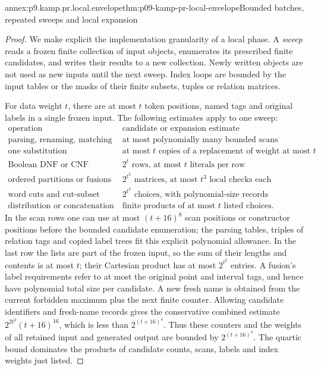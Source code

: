 \begin{annexitem}{annex:p9.kamp.pr.local.envelope}{thm:p09-kamp-pr-local-envelope}{Bounded batches, repeated sweeps and local expansion}
\begin{proof}
We make explicit the implementation granularity of a local phase.
A \emph{sweep} reads a frozen finite collection of input objects,
enumerates its prescribed finite candidates, and writes their results
to a new collection. Newly written objects are not used as new inputs
until the next sweep. Index loops are bounded by the input tables or
the masks of their finite subsets, tuples or relation matrices.

For data weight \(t\), there are at most \(t\) token
positions, named tags and original labels in a single frozen input.
The following estimates apply to one sweep:
\[
\begin{array}{l|l}
 \text{operation}&\text{candidate or expansion estimate}\\ \hline
 \text{parsing, renaming, matching}&\text{at most polynomially many bounded scans}\\
 \text{one substitution}&\text{at most }t\text{ copies of a replacement of weight at most }t\\
 \text{Boolean DNF or CNF}&2^t\text{ rows, at most }t\text{ literals per row}\\
 \text{ordered partitions or fusions}&2^{t^2}\text{ matrices, at most }t^3\text{ local checks each}\\
 \text{word cuts and cut-subset tuples}&2^{t^2}\text{ choices, with polynomial-size records}\\
 \text{distribution or concatenation}&\text{finite products of at most }t\text{ listed choices}.
\end{array}
\]
In the scan rows one can use at most \((t+16)^8\) scan positions
or constructor positions before the bounded candidate enumeration;
the parsing tables, triples of relation tags and copied label trees
fit this explicit polynomial allowance. In the last row the lists are part of the frozen input, so the
sum of their lengths and contents is at most \(t\); their
Cartesian product has at most \(2^{t^2}\) entries. A fusion's
label requirements refer to at most the original point and interval
tags, and hence have polynomial total size per candidate. A new
fresh name is obtained from the current forbidden maximum plus
the next finite counter. Allowing candidate identifiers and fresh-name
records gives the conservative combined estimate
\(2^{2t^2}(t+16)^{16}\), which is less than
\(2^{(t+16)^4}\). Thus these counters and the weights of all
retained input and generated output are bounded by
\(2^{(t+16)^4}\). The quartic bound dominates the products
of candidate counts, scans, labels and index weights just listed.


\end{proof}
\end{annexitem}
